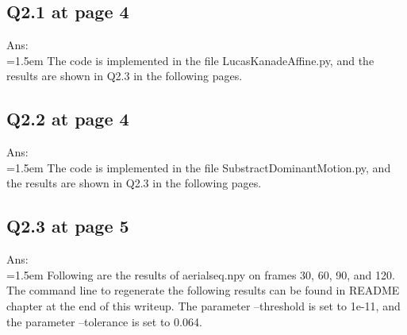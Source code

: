 \documentclass{article}
\begin{document}
	 

	\newpage
	\subsection*{Q2.1 at page 4}
	Ans:\\
	\hangindent=1.5em \hspace{1.5em} The code is implemented in the file LucasKanadeAffine.py, and the results are shown in Q2.3 in the following pages.	
	\newpage
	
	\subsection*{Q2.2 at page 4}
	Ans:\\
	\hangindent=1.5em \hspace{1.5em} The code is implemented in the file SubstractDominantMotion.py, and the results are shown in Q2.3 in the following pages.		
	
	
	\newpage
	\subsection*{Q2.3 at page 5}
	Ans:\\
	\hangindent=1.5em \hspace{1.5em} Following are the results of aerialseq.npy on frames 30, 60, 90, and 120. The command line to regenerate the following results can be found in README chapter at the end of this writeup. The parameter --threshold is set to 1e-11, and the parameter --tolerance is set to 0.064.
	
\end{document}
